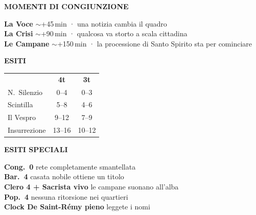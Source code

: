 \documentclass[10pt]{article}
\newcommand{\sez}[1]{%
  {\cinzel\fontsize{7.5}{9}\selectfont\color{oro}\bfseries\MakeUppercase{#1}}\par
  \vspace{0.5pt}{\color{oro!50}\rule{\linewidth}{0.4pt}}\par\vspace{2pt}%
}
\newcommand{\lbl}[1]{{\cinzel\fontsize{7.5}{9}\selectfont\color{bordoscuro}\bfseries #1}}
\begin{document}
\vspace{5pt}
\noindent
\begin{minipage}[t]{0.40\linewidth}
\sez{Momenti di Congiunzione}
{\fontsize{8}{10}\selectfont
\lbl{La Voce} ${\sim}$+45\,min · una notizia cambia il quadro\\
\lbl{La Crisi} ${\sim}$+90\,min · qualcosa va storto a scala cittadina\\
\lbl{Le Campane} ${\sim}$+150\,min · la processione di Santo Spirito sta per cominciare}
\end{minipage}\hfill
\begin{minipage}[t]{0.27\linewidth}
\sez{Esiti}
{\fontsize{8}{10}\selectfont
\begin{tabularx}{\linewidth}{@{}Xcc@{}}
                 & \lbl{4t}  & \lbl{3t}  \\
N.\ Silenzio     & 0--4      & 0--3      \\
Scintilla        & 5--8      & 4--6      \\
Il Vespro        & 9--12     & 7--9      \\
Insurrezione     & 13--16    & 10--12    \\
\end{tabularx}}
\end{minipage}\hfill
\begin{minipage}[t]{0.30\linewidth}
\sez{Esiti speciali}
{\fontsize{7.5}{9.2}\selectfont
\lbl{Cong.\ 0} rete completamente smantellata\\
\lbl{Bar.\ 4} casata nobile ottiene un titolo\\
\lbl{Clero 4 + Sacrista vivo} le campane suonano all'alba\\
\lbl{Pop.\ 4} nessuna ritorsione nei quartieri\\
\lbl{Clock De Saint-Rémy pieno} leggete i nomi}
\end{minipage}
\end{document}
